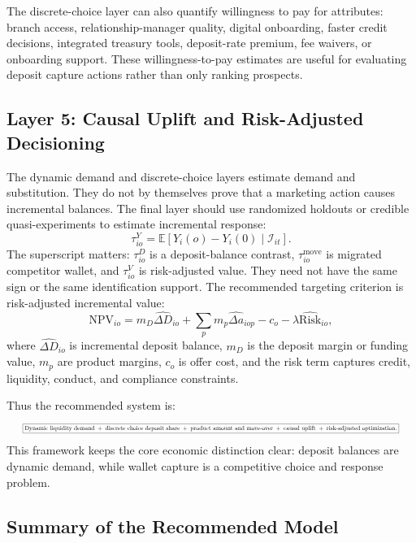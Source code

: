 \documentclass[11pt]{article}
\begin{document}
The discrete-choice layer can also quantify willingness to pay for attributes:
branch access, relationship-manager quality, digital onboarding, faster credit
decisions, integrated treasury tools, deposit-rate premium, fee waivers, or
onboarding support. These willingness-to-pay estimates are useful for
evaluating deposit capture actions rather than only ranking prospects.

\subsection{Layer 5: Causal Uplift and Risk-Adjusted Decisioning}

The dynamic demand and discrete-choice layers estimate demand and substitution.
They do not by themselves prove that a marketing action causes incremental
balances. The final layer should use randomized holdouts or credible
quasi-experiments to estimate incremental response:
\[
  \tau_{io}^{Y}
  =
  \mathbb{E}[Y_i(o)-Y_i(0)\mid \mathcal{I}_{it}].
\]
The superscript matters: $\tau_{io}^{D}$ is a deposit-balance contrast,
$\tau_{io}^{\mathrm{move}}$ is migrated competitor wallet, and
$\tau_{io}^{V}$ is risk-adjusted value. They need not have the same sign or
the same identification support.
The recommended targeting criterion is risk-adjusted incremental value:
\[
  \mathrm{NPV}_{io}
  =
  m_D \widehat{\Delta D}_{io}
  + \sum_p m_p \widehat{\Delta a}_{iop}
  - c_o
  - \lambda \widehat{\mathrm{Risk}}_{io},
\]
where $\widehat{\Delta D}_{io}$ is incremental deposit balance, $m_D$ is the
deposit margin or funding value, $m_p$ are product margins, $c_o$ is offer cost,
and the risk term captures credit, liquidity, conduct, and compliance
constraints.

Thus the recommended system is:
\[
\resizebox{0.96\linewidth}{!}{$\displaystyle
  \boxed{
  \text{Dynamic liquidity demand}
  \;+\;
  \text{discrete choice deposit share}
  \;+\;
  \text{product amount and move-over}
  \;+\;
  \text{causal uplift}
  \;+\;
  \text{risk-adjusted optimization}.}
$}
\]
This framework keeps the core economic distinction clear: deposit balances are
dynamic demand, while wallet capture is a competitive choice and response
problem.

\subsection{Summary of the Recommended Model}
\end{document}
